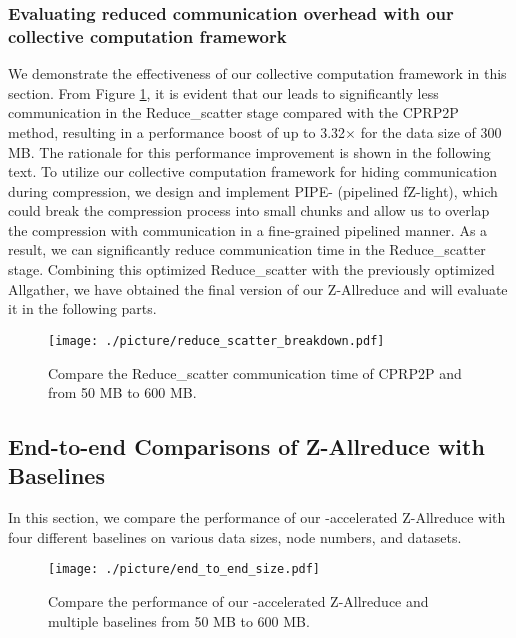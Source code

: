 \subsubsection{Evaluating reduced communication overhead with our collective computation framework}
We demonstrate the effectiveness of our collective computation framework in this section. From Figure \ref{fig-Overlap}, it is evident that our {\pname} leads to significantly less communication in the Reduce\_scatter stage compared with the CPRP2P method, resulting in a performance boost of up to 3.32$\times$ for the data size of 300 MB. The rationale for this performance improvement is shown in the following text. To utilize our collective computation framework for hiding communication during compression, we design and implement PIPE-{\fzlight} (pipelined fZ-light), which could break the compression process into small chunks and allow us to overlap the compression with communication in a fine-grained pipelined manner. As a result, we can significantly reduce communication time in the Reduce\_scatter stage. Combining this optimized Reduce\_scatter with the previously optimized Allgather, we have obtained the final version of our Z-Allreduce and will evaluate it in the following parts.



\begin{figure}[ht]
    \centering
    {\texttt{[image: ./picture/reduce\_scatter\_breakdown.pdf]}}
    \caption{Compare the Reduce\_scatter communication time of CPRP2P and {\pname} from 50 MB to 600 MB.} 
    \label{fig-Overlap}
\end{figure}



\subsection{End-to-end Comparisons of Z-Allreduce with Baselines}


In this section, we compare the performance of our {\pname}-accelerated Z-Allreduce with four different baselines on various data sizes, node numbers, and datasets.



\begin{figure}[ht]
    \centering
    {\texttt{[image: ./picture/end\_to\_end\_size.pdf]}}
    \caption{Compare the performance of our {\pname}-accelerated Z-Allreduce and multiple baselines from 50 MB to 600 MB.} 
    \label{fig-64-sizes}
\end{figure}


